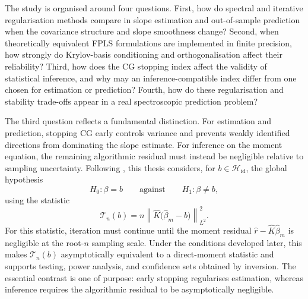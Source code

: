 The study is organised around four questions. First, how do spectral and iterative regularisation methods compare in slope estimation and out-of-sample prediction when the covariance structure and slope smoothness change? Second, when theoretically equivalent FPLS formulations are implemented in finite precision, how strongly do Krylov-basis conditioning and orthogonalisation affect their reliability? Third, how does the CG stopping index affect the validity of statistical inference, and why may an inference-compatible index differ from one chosen for estimation or prediction? Fourth, how do these regularisation and stability trade-offs appear in a real spectroscopic prediction problem?

The third question reflects a fundamental distinction. For estimation and prediction, stopping CG early controls variance and prevents weakly identified directions from dominating the slope estimate. For inference on the moment equation, the remaining algorithmic residual must instead be negligible relative to sampling uncertainty. Following \textcite{babii_carrasco_tsafack_2026}, this thesis considers, for $b\in\mathcal H_{\mathrm{id}}$, the global hypothesis
\begin{equation}
    H_0:\beta=b
    \qquad\text{against}\qquad
    H_1:\beta\neq b,
    \label{eq:intro-null-hypothesis}
\end{equation}
using the statistic
\begin{equation}
    \mathcal T_n(b)
    =n\left\|\widehat K\bigl(\widehat\beta_m-b\bigr)\right\|_{L^2}^{2}.
    \label{eq:intro-test-statistic}
\end{equation}
For this statistic, iteration must continue until the moment residual
$\widehat r-\widehat K\widehat\beta_m$ is negligible at the root-$n$ sampling
scale. Under the conditions developed later, this makes
$\mathcal T_n(b)$ asymptotically equivalent to a direct-moment statistic and
supports testing, power analysis, and confidence sets obtained by inversion.
The essential contrast is one of purpose: early stopping regularises
estimation, whereas inference requires the algorithmic residual to be
asymptotically negligible.

